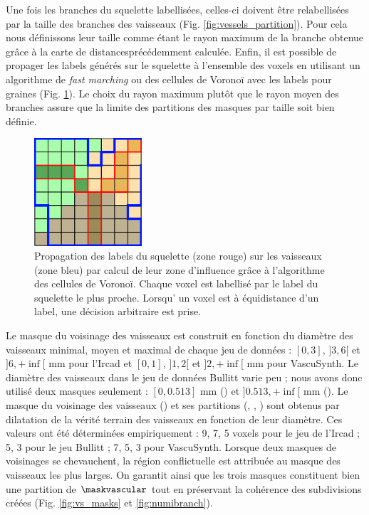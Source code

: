 Une fois les branches du squelette labellisées, celles-ci doivent être relabellisées par la taille des branches des vaisseaux (Fig. \ref{fig:vessels_partition}). Pour cela nous définissons leur taille comme étant le rayon maximum de la branche obtenue grâce à la carte de distancesprécédemment calculée. Enfin, il est possible de propager les labels générés sur le squelette à l'ensemble des voxels en utilisant un algorithme de \textit{fast marching} ou des cellules de Voronoï avec les labels pour graines (Fig. \ref{fig:voronoi}). Le choix du rayon maximum plutôt que le rayon moyen des branches assure que la limite des partitions des masques par taille soit bien définie.
\begin{figure}[!ht]
  \centering
  \includegraphics[height=4cm]{Images/voronoi.png}
  \caption{Propagation des labels du squelette (zone rouge) sur les vaisseaux (zone bleu) par calcul de leur zone d'influence grâce à l'algorithme des cellules de Voronoï. Chaque voxel est labellisé par le label du squelette le plus proche. Lorsqu' un voxel est à équidistance d'un label, une décision arbitraire est prise.}
  \label{fig:voronoi}
\end{figure}
Le masque du voisinage des vaisseaux est construit en fonction du diamètre des vaisseaux minimal, moyen et maximal de chaque jeu de données : $[0,3]$, $]3,6[$ et $]6,+\inf[$ mm pour l'Ircad et $[0,1]$, $]1,2[$ et $]2,+\inf[$ mm pour VascuSynth. Le diamètre des vaisseaux dans le jeu de données Bullitt varie peu ; nous avons donc utilisé deux masques seulement : $[0,0.513]$ mm (\maskvesselSmall) et $]0.513,+\inf[$ mm (\maskvesselMedium). Le masque du voisinage des vaisseaux (\maskvessel) et ses partitions (\maskvesselLarge, \maskvesselMedium, \maskvesselSmall) sont obtenus par dilatation de la vérité terrain des vaisseaux en fonction de leur diamètre. Ces valeurs ont été déterminées empiriquement : 9, 7, 5 voxels pour le jeu de l'Ircad ; 5, 3 pour le jeu Bullitt ; 7, 5, 3 pour VascuSynth. Lorsque deux masques de voisinages se chevauchent, la région conflictuelle est attribuée au masque des vaisseaux les plus larges. On garantit ainsi que les trois masques constituent bien une partition de $\maskvascular$ tout en préservant la cohérence des subdivisions créées (Fig. \ref{fig:vs_masks} et \ref{fig:numibranch}).
